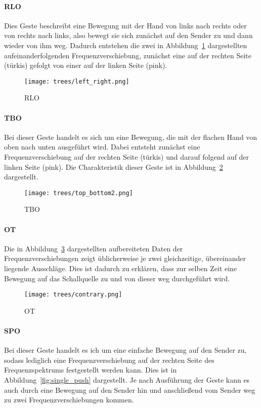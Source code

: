 \paragraph*{\acl{RLO}}
Dies Geste beschreibt eine Bewegung mit der Hand von links nach rechts oder von rechts nach links, also bewegt sie sich zunächst auf den Sender zu und dann wieder von ihm weg. Dadurch entstehen die zwei in Abbildung~\ref{fig:left_right} dargestellten aufeinanderfolgenden Frequenzverschiebung, zunächst eine auf der rechten Seite (türkis) gefolgt von einer auf der linken Seite (pink).

\begin{figure}[htb] \centering
\texttt{[image: trees/left\_right.png]}
\caption{\acl{RLO}}
\label{fig:left_right}
\end{figure}


\paragraph*{\acl{TBO}}
Bei dieser Geste handelt es sich um eine Bewegung, die mit der flachen Hand von oben nach unten ausgeführt wird. Dabei entsteht zunächst eine Frequenzverschiebung auf der rechten Seite (türkis) und darauf folgend auf der linken Seite (pink). Die Charakteristik dieser Geste ist in Abbildung~\ref{fig:top_bottom} dargestellt. 

\begin{figure}[hb] \centering
\texttt{[image: trees/top\_bottom2.png]}
\caption{\acl{TBO}}
\label{fig:top_bottom}
\end{figure}

\paragraph*{\acl{OT}}
Die in Abbildung~\ref{fig:contrary} dargestellten aufbereiteten Daten der Frequenzverschiebungen zeigt üblicherweise je zwei gleichzeitige, übereinander liegende Ausschläge. Dies ist dadurch zu erklären, dass zur selben Zeit eine Bewegung auf das Schallquelle zu und von dieser weg durchgeführt wird.

\begin{figure}[htbp] \centering
\texttt{[image: trees/contrary.png]}
\caption{\acl{OT}}
\label{fig:contrary}
\end{figure}


\paragraph*{\acl{SPO}}
Bei dieser Geste handelt es ich um eine einfache Bewegung auf den Sender zu, sodass lediglich eine Frequenzverschiebung auf der rechten Seite des Frequenzspektrums festgestellt werden kann. Dies ist in Abbildung~\ref{fig:single_push} dargestellt. Je nach Ausführung der Geste kann es auch durch eine Bewegung auf den Sender hin und anschließend vom Sender weg zu zwei Frequenzverschiebungen kommen.

